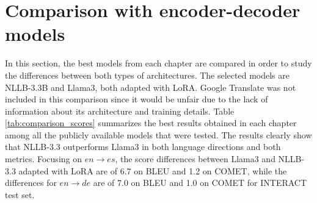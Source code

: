 \documentclass[11pt,english,listoffigures,listoftables]{tfgetsinf}
\begin{document}

\section{Comparison with encoder-decoder models}

In this section, the best models from each chapter are compared in order to study the differences between both types of architectures. The selected models are NLLB-3.3B and Llama3, both adapted with LoRA. Google Translate was not included in this comparison since it would be unfair due to the lack of information about its architecture and training details. Table \ref{tab:comparison_scores} summarizes the best results obtained in each chapter among all the publicly available models that were tested. The results clearly show that NLLB-3.3 outperforms Llama3 in both language directions and both metrics. Focusing on $en \rightarrow es$, the score differences between Llama3 and NLLB-3.3 adapted with LoRA are of 6.7 on BLEU and 1.2 on COMET, while the differences for $en \rightarrow de$ are of 7.0 on BLEU and 1.0 on COMET for INTERACT test set.

\end{document}
